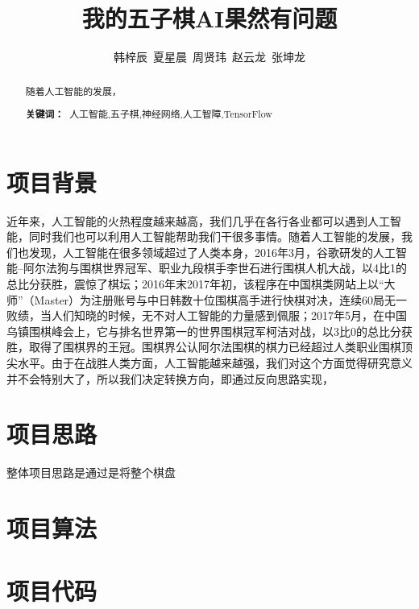 \documentclass[a4paper]{article}
\title{\heiti \Large 我的五子棋AI果然有问题}%
\author{\songti \small 韩梓辰\ 夏星晨\ 周贤玮\ 赵云龙\ 张坤龙}%
\renewcommand{\headrulewidth}{0.4pt}
\begin{document}
\maketitle%
\thispagestyle{fancy}%
\lhead{\textcolor{gray} {计算机科学}}
\rhead{\textcolor{gray} {DOI:xxxxxx}}
\renewcommand{\headrulewidth}{0.4pt}
\begin{abstract}
    随着人工智能的发展，
    \par\textbf{关键词：\ }人工智能,五子棋,神经网络,人工智障,TensorFlow
\end{abstract}
\tableofcontents  %
\newpage
    \begin{multicols}{2}
    \section{项目背景}
    近年来，人工智能的火热程度越来越高，我们几乎在各行各业都可以遇到人工智能，同时我们也可以利用人工智能帮助我们干很多事情。随着人工智能的发展，我们也发现，人工智能在很多领域超过了人类本身，2016年3月，谷歌研发的人工智能--阿尔法狗与围棋世界冠军、职业九段棋手李世石进行围棋人机大战，以4比1的总比分获胜，震惊了棋坛；2016年末2017年初，该程序在中国棋类网站上以“大师”（Master）为注册账号与中日韩数十位围棋高手进行快棋对决，连续60局无一败绩，当人们知晓的时候，无不对人工智能的力量感到佩服；2017年5月，在中国乌镇围棋峰会上，它与排名世界第一的世界围棋冠军柯洁对战，以3比0的总比分获胜，取得了围棋界的王冠。围棋界公认阿尔法围棋的棋力已经超过人类职业围棋顶尖水平。由于在战胜人类方面，人工智能越来越强，我们对这个方面觉得研究意义并不会特别大了，所以我们决定转换方向，即通过反向思路实现，
    \section{项目思路}
    整体项目思路是通过是将整个棋盘
    \section{项目算法}

    \section{项目代码}
    \newpage
    \begin{thebibliography}{30}%
    \end{thebibliography}
    \newpage
\end{multicols}
\end{document}
